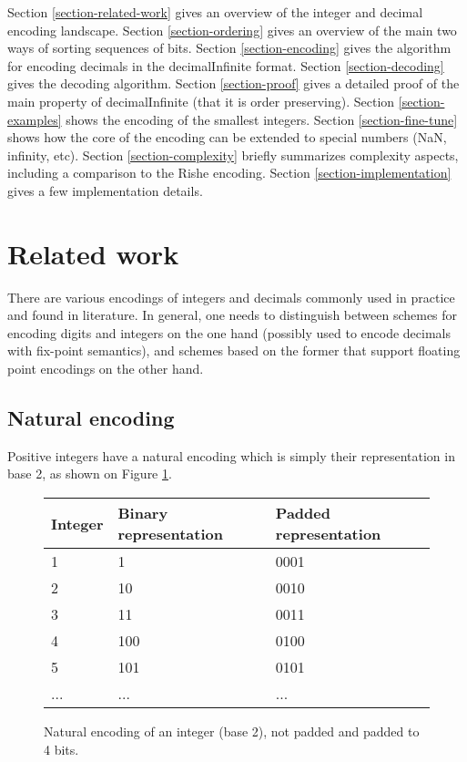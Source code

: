 \documentclass{acm_proc_article-sp}
\begin{document}
Section \ref{section-related-work} gives an overview of the integer and decimal encoding landscape.
Section \ref{section-ordering} gives an overview of the main two ways of sorting sequences of bits.
Section \ref{section-encoding} gives the algorithm for encoding decimals in the decimalInfinite format.
Section \ref{section-decoding} gives the decoding algorithm.
Section \ref{section-proof} gives a detailed proof of the main property of decimalInfinite (that it is order preserving).
Section \ref{section-examples} shows the encoding of the smallest integers.
Section \ref{section-fine-tune} shows how the core of the encoding can be extended to special numbers (NaN, infinity, etc).
Section \ref{section-complexity} briefly summarizes complexity aspects, including a comparison to the Rishe encoding.
Section \ref{section-implementation} gives a few implementation details.

\section{Related work}

There are various encodings of integers and decimals commonly used in practice and found in literature. In general, one needs to distinguish between schemes for encoding digits and integers on the one hand (possibly used to encode decimals with fix-point semantics), and schemes based on the former that support floating point encodings on the other hand.

\label{section-related-work}

\subsection{Natural encoding}

Positive integers have a natural encoding which is simply their representation in base 2, as shown on Figure \ref{figure-natural-encoding}.

\begin{figure}[p]
\caption{Natural encoding of an integer (base 2), not padded and padded to 4 bits.}
\label{figure-natural-encoding}
\center
\begin{tabular}{|l|l|l|}
\hline
Integer & Binary representation & Padded representation \\
\hline
1 & 1 & 0001 \\
\hline
2 & 10 & 0010 \\
\hline
3 & 11 & 0011\\
\hline
4 & 100  & 0100 \\
\hline
5 & 101  & 0101\\
\hline
... & ... & ... \\
\hline
\end{tabular}
\end{figure}
\end{document}
